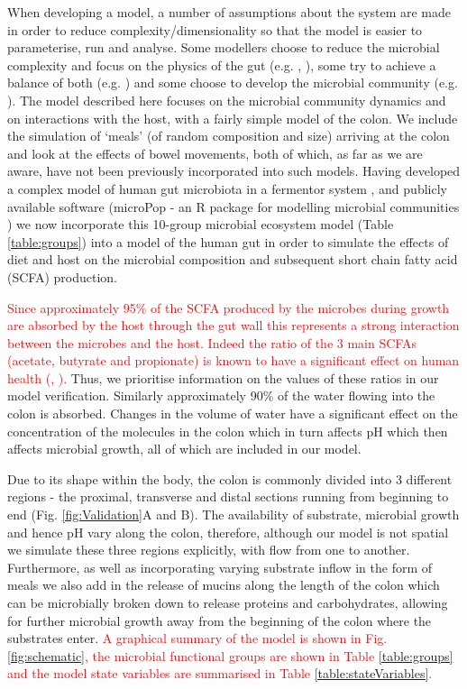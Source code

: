 \documentclass[a4paper]{article}
\begin{document}
When developing a model, a number of assumptions about the system are made in order to reduce complexity/dimensionality so that the model is easier to parameterise, run and analyse. Some modellers choose to reduce the microbial complexity and focus on the physics of the gut (e.g. \cite{Cremer16}, \cite{Cremer17}), some try to achieve a balance of both (e.g. \cite{Munoz}) and some choose to develop the microbial community (e.g. \cite{smith}). The model described here focuses on the microbial community dynamics and on interactions with the host, with a fairly simple model of the colon. We include the simulation of `meals' (of random composition and size) arriving at the colon and look at the effects of bowel movements, both of which, as far as we are aware, have not been previously incorporated into such models.
Having developed a complex model of human gut microbiota in a fermentor system \citep{Kettle2015}, and publicly available software (microPop - an R package for modelling microbial communities \citep{Kettle2018}) we now incorporate this 10-group microbial ecosystem model (Table \ref{table:groups}) into a model of the human gut in order to simulate the effects of diet and host on the microbial composition and subsequent short chain fatty acid (SCFA) production. 

\textcolor{red}{Since approximately 95\% of the SCFA produced by the microbes during growth are absorbed by the host through the gut wall this represents a strong interaction between the microbes and the host. 
Indeed the ratio of the 3 main SCFAs (acetate, butyrate and propionate) is known to have a significant effect on human health (\cite{louis2014}, \cite{morrison2016}).} 
Thus, we prioritise information on the values of these ratios in our model verification.
Similarly approximately 90\% of the water flowing into the colon is absorbed. Changes in the volume of water have a significant effect on the concentration of the molecules in the colon which in turn affects pH which then affects microbial growth, all of which are included in our model.

Due to its shape within the body, the colon is commonly divided into 3 different regions - the proximal, transverse and distal sections running from beginning to end (Fig. \ref{fig:Validation}A and B). 
The availability of substrate, microbial growth and hence pH vary along the colon, therefore, although our model is not spatial we simulate these three regions explicitly, with flow from one to another.
Furthermore, as well as incorporating varying substrate inflow in the form of meals we also add in the release of mucins along the length of the colon which can be microbially broken down to release proteins and carbohydrates, allowing for further microbial growth away from the beginning of the colon where the substrates enter.
\textcolor{red}{A graphical summary of the model is shown in Fig. \ref{fig:schematic}, the microbial functional groups are shown in Table \ref{table:groups} and the model state variables are summarised in Table \ref{table:stateVariables}.} 
\end{document}
